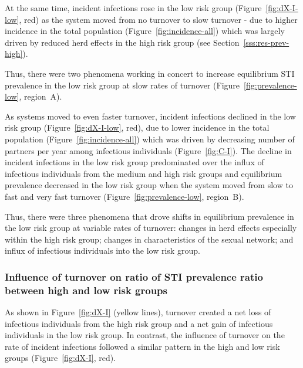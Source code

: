 
At the same time, incident
infections rose in the low risk group 
(Figure~\ref{fig:dX-I-low}, red) as the system moved from 
no turnover to slow turnover -
due to higher incidence in the total population (Figure~\ref{fig:incidence-all}) 
which was largely driven by  
reduced herd effects in the high risk group
(see Section~\ref{sss:res-prev-high}).

Thus, there were two phenomena working in concert
to increase equilibrium STI prevalence in the low risk group
at slow rates of turnover (Figure~\ref{fig:prevalence-low}, region~A).
\par
As systems moved to even faster turnover,
incident infections declined in 
the low risk group
(Figure~\ref{fig:dX-I-low}, red),		%
due to lower incidence in the total population
(Figure~\ref{fig:incidence-all}) 
which was driven by 
decreasing number of partners per year among infectious individuals
(Figure~\ref{fig:C-I}).
The decline in incident infections in the low
risk group predominated over the influx
of infectious individuals from the medium and high risk groups
and equilibrium prevalence decreased in the low risk group when 
the system moved from slow to fast and very fast turnover
(Figure~\ref{fig:prevalence-low}, region~B).  %

Thus, there were three phenomena that
drove shifts in equilibrium prevalence in the low risk group 
at variable rates of turnover: changes in herd effects especially within the high risk group;
changes in characteristics of the sexual network; and influx of infectious individuals 
into the low risk group.

\subsubsection{ Influence of turnover on ratio of STI prevalence ratio between high and low risk groups}
As shown in Figure~\ref{fig:dX-I} (yellow lines), turnover created
a net loss of infectious individuals from the high risk group and
a net gain of infectious individuals in the low risk group.
In contrast, the influence of turnover on
the rate of incident infections followed a similar pattern			
in the high and low risk groups (Figure~\ref{fig:dX-I}, red).

